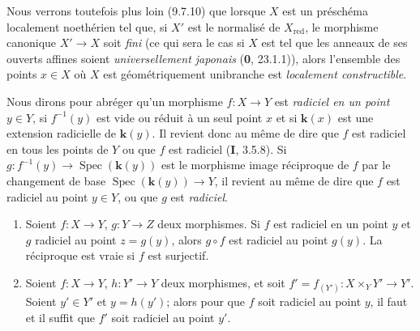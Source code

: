Nous verrons toutefois plus loin (9.7.10) que lorsque $X$ est un préschéma
localement noethérien tel que, si $X'$ est le normalisé de
$X_{\mathrm{red}}$, le morphisme canonique $X'\to X$ soit \emph{fini} (ce qui sera
le cas si $X$ est tel que les anneaux de ses ouverts affines soient
\emph{universellement japonais} (\textbf{0}, 23.1.1)), alors l'ensemble des points $x\in X$
où $X$ est géométriquement unibranche est \emph{localement constructible}.

\begin{env}[6.15.3]
\label{IV.2.s6.15.3-fr}
Nous dirons pour abréger qu'un morphisme $f:X\to Y$ est \emph{radiciel en
un point} $y\in Y$, si $f^{-1}(y)$ est vide ou réduit à un seul point $x$
et si $\boldsymbol{k}(x)$ est une extension radicielle de $\boldsymbol{k}(y)$. Il revient donc au
même de dire que $f$ est radiciel en tous les points de $Y$ ou que $f$ est
radiciel (\textbf{I}, 3.5.8). Si
$g:f^{-1}(y)\to\operatorname{Spec}(\boldsymbol{k}(y))$ est le morphisme image réciproque
de $f$ par le changement de base
$\operatorname{Spec}(\boldsymbol{k}(y))\to Y$, il revient au même de dire que $f$ est
radiciel au point $y\in Y$, ou que $g$ est \emph{radiciel}.
\end{env}

\begin{lemma}[6.15.3.1]
\label{IV.2.s6.15.3.1-fr}
\begin{enumerate}
\item[\textup{(i)}] Soient $f:X\to Y$, $g:Y\to Z$ deux morphismes. Si $f$ est
radiciel en un point $y$ et $g$ radiciel au point $z=g(y)$, alors $g\circ f$
est radiciel au point $g(y)$. La réciproque est vraie si $f$ est surjectif.
\item[\textup{(ii)}] Soient $f:X\to Y$, $h:Y'\to Y$ deux morphismes, et soit
$f'=f_{(Y')}:X\times_Y Y'\to Y'$. Soient $y'\in Y'$ et $y=h(y')$; alors
pour que $f$ soit radiciel au point $y$, il faut et il suffit que $f'$ soit
radiciel au point $y'$.
\end{enumerate}
\end{lemma}

